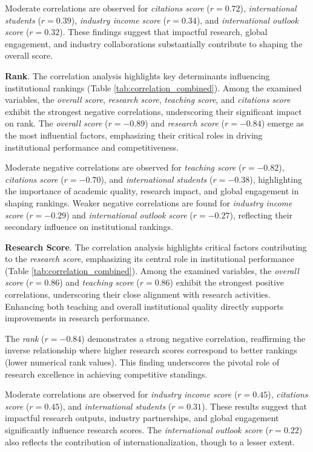 \documentclass[conference]{IEEEtran}
\begin{document}
Moderate correlations are observed for \textit{citations score} ($r = 0.72$), \textit{international students} ($r = 0.39$), \textit{industry income score} ($r = 0.34$), and \textit{international outlook score} ($r = 0.32$). These findings suggest that impactful research, global engagement, and industry collaborations substantially contribute to shaping the overall score.


\textbf{Rank}. The correlation analysis highlights key determinants influencing institutional rankings (Table \ref{tab:correlation_combined}). Among the examined variables, the \textit{overall score}, \textit{research score}, \textit{teaching score}, and \textit{citations score} exhibit the strongest negative correlations, underscoring their significant impact on rank. The \textit{overall score} ($r = -0.89$) and \textit{research score} ($r = -0.84$) emerge as the most influential factors, emphasizing their critical roles in driving institutional performance and competitiveness.

Moderate negative correlations are observed for \textit{teaching score} ($r = -0.82$), \textit{citations score} ($r = -0.70$), and \textit{international students} ($r = -0.38$), highlighting the importance of academic quality, research impact, and global engagement in shaping rankings. Weaker negative correlations are found for \textit{industry income score} ($r = -0.29$) and \textit{international outlook score} ($r = -0.27$), reflecting their secondary influence on institutional rankings.


\textbf{Research Score}. The correlation analysis highlights critical factors contributing to the \textit{research score}, emphasizing its central role in institutional performance (Table \ref{tab:correlation_combined}). Among the examined variables, the \textit{overall score} ($r = 0.86$) and \textit{teaching score} ($r = 0.86$) exhibit the strongest positive correlations, underscoring their close alignment with research activities. Enhancing both teaching and overall institutional quality directly supports improvements in research performance.

The \textit{rank} ($r = -0.84$) demonstrates a strong negative correlation, reaffirming the inverse relationship where higher research scores correspond to better rankings (lower numerical rank values). This finding underscores the pivotal role of research excellence in achieving competitive standings.

Moderate correlations are observed for \textit{industry income score} ($r = 0.45$), \textit{citations score} ($r = 0.45$), and \textit{international students} ($r = 0.31$). These results suggest that impactful research outputs, industry partnerships, and global engagement significantly influence research scores. The \textit{international outlook score} ($r = 0.22$) also reflects the contribution of internationalization, though to a lesser extent.
\end{document}
